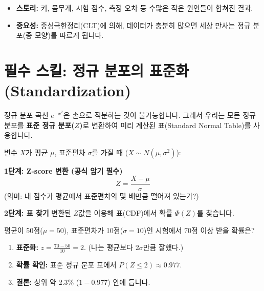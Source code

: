 \documentclass[11pt,a4paper]{book}
\theoremstyle{definition}
\begin{document}
\begin{storybox}[title={3. 정규 분포 (Normal): "세상의 모든 잡음(Noise)"}]
\begin{itemize}
    \item \textbf{스토리:} 키, 몸무게, 시험 점수, 측정 오차 등 수많은 작은 원인들이 합쳐진 결과.
    \item \textbf{중요성:} 중심극한정리(CLT)에 의해, 데이터가 충분히 많으면 세상 만사는 정규 분포(종 모양)를 따르게 됩니다.
\end{itemize}
\end{storybox}

\section{필수 스킬: 정규 분포의 표준화 (Standardization)}

정규 분포 곡선 $e^{-x^2}$은 손으로 적분하는 것이 불가능합니다. 그래서 우리는 모든 정규 분포를 \textbf{표준 정규 분포($Z$)}로 변환하여 미리 계산된 표(Standard Normal Table)를 사용합니다.

\begin{mathstep}[title={모든 정규 분포를 $N(0, 1)$로 만드는 마법}]
변수 $X$가 평균 $\mu$, 표준편차 $\sigma$를 가질 때 ($X \sim N(\mu, \sigma^2)$):

\textbf{1단계: Z-score 변환 (공식 암기 필수)}
\[ Z = \frac{X - \mu}{\sigma} \]
(의미: 내 점수가 평균에서 표준편차의 몇 배만큼 떨어져 있는가?)

\textbf{2단계: 표 찾기}
변환된 $Z$값을 이용해 표(CDF)에서 확률 $\Phi(Z)$를 찾습니다.
\end{mathstep}

\begin{examplebox}[title={수능 점수 계산}]
평균이 50점($\mu=50$), 표준편차가 10점($\sigma=10$)인 시험에서 70점 이상 받을 확률은?
\begin{enumerate}
    \item \textbf{표준화:} $z = \frac{70 - 50}{10} = 2$. (나는 평균보다 2$\sigma$만큼 잘했다.)
    \item \textbf{확률 확인:} 표준 정규 분포 표에서 $P(Z \le 2) \approx 0.977$.
    \item \textbf{결론:} 상위 약 2.3\% ($1 - 0.977$) 안에 듭니다.
\end{enumerate}
\end{examplebox}

\end{document}

